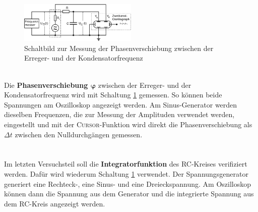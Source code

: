 \begin{figure}
	\includegraphics[width=0.5\textwidth]{Bild3.png}
	\centering
	\caption{Schaltbild zur Messung der Phasenverschiebung zwischen der Erreger- und der Kondensatorfrequenz}
	\label{fig:Phase}
\end{figure} \ \\
Die \textbf{Phasenverschiebung $\bm{\varphi}$} zwischen der Erreger- und der Kondensatorfrequenz wird mit Schaltung \ref{fig:Phase} gemessen. So können beide Spannungen am Oszilloskop angezeigt werden. Am Sinus-Generator werden dieselben Frequenzen, die zur Messung der Amplituden verwendet werden, eingestellt und mit der \textsc{Cursor}-Funktion wird direkt die Phasenverschiebung als $\Delta t$ zwischen den Nulldurchgängen gemessen. \\
\ \\
\ \\
Im letzten Versuchsteil soll die \textbf{Integratorfunktion} des RC-Kreises verifiziert werden. Dafür wird wiederum Schaltung \ref{fig:Phase} verwendet. Der Spannungsgenerator generiert eine Rechteck-, eine Sinus- und eine Dreieckspannung. Am Oszilloskop können dann die Spannung aus dem Generator und die integrierte Spannung aus dem RC-Kreis angezeigt werden.

